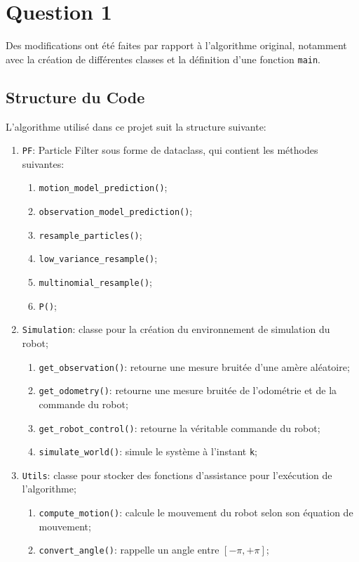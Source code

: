 \documentclass[../CSC_5RO12_TA_TP3.tex]{subfiles}
\begin{document}
\section{Question 1}
\begin{remark}
    Des modifications ont été faites par rapport à l'algorithme original, notamment avec la création de différentes classes et la définition d'une fonction \texttt{main}.
\end{remark}

\subsection{Structure du Code}
\noindent L'algorithme utilisé dans ce projet suit la structure suivante:
\begin{enumerate}
    \item \texttt{PF}: Particle Filter sous forme de dataclass, qui contient les méthodes suivantes:
    \begin{enumerate}[noitemsep]
        \item \texttt{motion\_model\_prediction()};
        \item \texttt{observation\_model\_prediction()};
        \item \texttt{resample\_particles()};
        \item \texttt{low\_variance\_resample()};
        \item \texttt{multinomial\_resample()};
        \item \texttt{P()};
    \end{enumerate}
    \item \texttt{Simulation}: classe pour la création du environnement de simulation du robot;
    \begin{enumerate}[noitemsep]
        \item \texttt{get\_observation()}: retourne une mesure bruitée d'une amère aléatoire;
        \item \texttt{get\_odometry()}: retourne une mesure bruitée de l'odométrie et de la commande du robot;
        \item \texttt{get\_robot\_control()}: retourne la véritable commande du robot;
        \item \texttt{simulate\_world()}: simule le système à l'instant \texttt{k};
    \end{enumerate}
    \item \texttt{Utils}: classe pour stocker des fonctions d'assistance pour l'exécution de l'algorithme;
    \begin{enumerate}[noitemsep]
        \item \texttt{compute\_motion()}: calcule le mouvement du robot selon son équation de mouvement;
        \item \texttt{convert\_angle()}: rappelle un angle entre $[-\pi, +\pi]$;
    \end{enumerate}
\end{enumerate}
\end{document}
